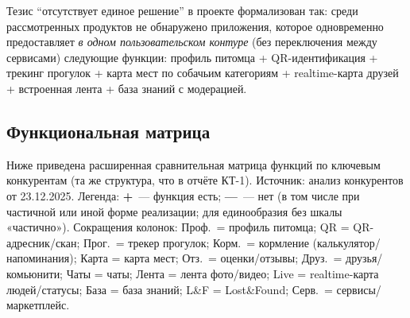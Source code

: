 \documentclass[12pt,a4paper]{article}
\begin{document}
Тезис \enquote{отсутствует единое решение} в проекте формализован так: среди рассмотренных продуктов не обнаружено приложения, которое одновременно предоставляет \textit{в одном пользовательском контуре} (без переключения между сервисами) следующие функции: профиль питомца + QR-идентификация + трекинг прогулок + карта мест по собачьим категориям + realtime-карта друзей + встроенная лента + база знаний с модерацией.

\subsection{Функциональная матрица}

Ниже приведена расширенная сравнительная матрица функций по ключевым конкурентам (та же структура, что в отчёте КТ-1). Источник: анализ конкурентов от 23.12.2025. Легенда: \textbf{+}~--- функция есть; \textbf{---}~--- нет (в том числе при частичной или иной форме реализации; для единообразия без шкалы «частично»). Сокращения колонок: Проф.\ = профиль питомца; QR = QR-адресник/скан; Прог.\ = трекер прогулок; Корм.\ = кормление (калькулятор/напоминания); Карта = карта мест; Отз.\ = оценки/отзывы; Друз.\ = друзья/комьюнити; Чаты = чаты; Лента = лента фото/видео; Live = realtime-карта людей/статусы; База = база знаний; L\&F = Lost\&Found; Серв.\ = сервисы/маркетплейс.
\end{document}
